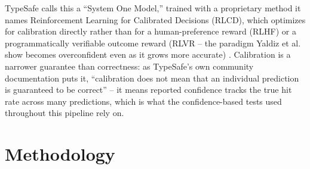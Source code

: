 \documentclass[journal]{IEEEtran}
\begin{document}
TypeSafe calls this a ``System One Model,'' trained with a proprietary method it names Reinforcement Learning for Calibrated Decisions (RLCD), which optimizes for calibration directly rather than for a human-preference reward (RLHF) or a programmatically verifiable outcome reward (RLVR -- the paradigm Yaldiz et al.\ \cite{ref10} show becomes overconfident even as it grows more accurate) \cite{ref5}. Calibration is a narrower guarantee than correctness: as TypeSafe's own community documentation puts it, ``calibration does not mean that an individual prediction is guaranteed to be correct'' \cite{ref7} -- it means reported confidence tracks the true hit rate across many predictions, which is what the confidence-based tests used throughout this pipeline rely on.

\section{Methodology}
\end{document}
